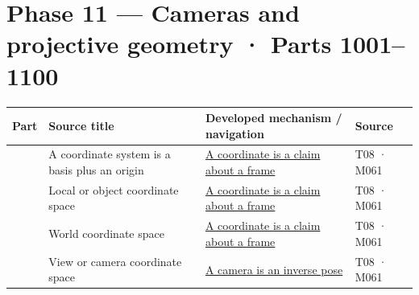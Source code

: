 \section{Phase 11 --- Cameras and projective geometry · Parts 1001--1100}\label{appendix-fd090d982a15-phase-11-cameras-and-projective-geometry-parts-10011100}

{\def\LTcaptype{none} %
\begin{longtable}[]{@{}
  >{\raggedleft\arraybackslash}p{}
  >{\raggedright\arraybackslash}p{}
  >{\raggedright\arraybackslash}p{}
  >{\raggedright\arraybackslash}p{}@{}}
\toprule\noalign{}
\begin{minipage}[b]{\linewidth}\raggedleft
Part
\end{minipage} & \begin{minipage}[b]{\linewidth}\raggedright
Source title
\end{minipage} & \begin{minipage}[b]{\linewidth}\raggedright
Developed mechanism / navigation
\end{minipage} & \begin{minipage}[b]{\linewidth}\raggedright
Source
\end{minipage} \\
\midrule\noalign{}
\endhead
\bottomrule\noalign{}
\endlastfoot
1001 & A coordinate system is a basis plus an origin & \href{Continuous\%20Notes/Computing\%20Foundations\%20-\%20From\%20Bits\%20to\%20C++\%20and\%20Systems\%20APIs\#A\%20coordinate\%20is\%20a\%20claim\%20about\%20a\%20frame/}{A coordinate is a claim about a frame} & T08 · M061 \\
1002 & Local or object coordinate space & \href{Continuous\%20Notes/Computing\%20Foundations\%20-\%20From\%20Bits\%20to\%20C++\%20and\%20Systems\%20APIs\#A\%20coordinate\%20is\%20a\%20claim\%20about\%20a\%20frame/}{A coordinate is a claim about a frame} & T08 · M061 \\
1003 & World coordinate space & \href{Continuous\%20Notes/Computing\%20Foundations\%20-\%20From\%20Bits\%20to\%20C++\%20and\%20Systems\%20APIs\#A\%20coordinate\%20is\%20a\%20claim\%20about\%20a\%20frame/}{A coordinate is a claim about a frame} & T08 · M061 \\
1004 & View or camera coordinate space & \href{Continuous\%20Notes/Computing\%20Foundations\%20-\%20From\%20Bits\%20to\%20C++\%20and\%20Systems\%20APIs\#A\%20camera\%20is\%20an\%20inverse\%20pose/}{A camera is an inverse pose} & T08 · M061 \\

\end{longtable}}
